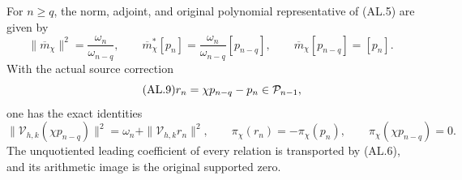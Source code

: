\begin{proposition}
For $n\ge q$, the norm, adjoint, and original polynomial representative of
(AL.5) are given by
\begin{equation}\tag{AL.8}
 \|\overline m_\chi\|^2=\frac{\omega_n}{\omega_{n-q}},\qquad
 \overline m_\chi^*[p_n]
 =\frac{\omega_n}{\omega_{n-q}}[p_{n-q}],\qquad
 \overline m_\chi[p_{n-q}]=[p_n].
\end{equation}
With the actual source correction
\begin{equation}\tag{AL.9}
 r_n=\chi p_{n-q}-p_n\in\mathcal P_{n-1},
\end{equation}
one has the exact identities
\begin{equation}\tag{AL.10}
 \|\mathcal V_{h,k}(\chi p_{n-q})\|^2
   =\omega_n+\|\mathcal V_{h,k}r_n\|^2,\qquad
 \pi_\chi(r_n)=-\pi_\chi(p_n),\qquad
 \pi_\chi(\chi p_{n-q})=0.
\end{equation}
The unquotiented leading coefficient of every relation is transported by
(AL.6), and its arithmetic image is the original supported zero.
\end{proposition}

